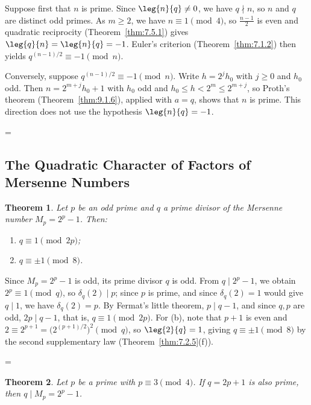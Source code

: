 \documentclass[11pt]{article}
\makeatletter
\theoremstyle{ntstyle}
\newtheorem{theorem}{Theorem}[subsection]
\let\nt@closedisplay\]
\def\nt@guardedclose{\@ifnextchar\par{\nt@closeafterpar}{\@ifnextchar\end{\postdisplaypenalty\@M\nt@closedisplay}{\nt@closedisplay}}}
\def\nt@closeafterpar\par{\@ifnextchar\par{\nt@closeafterpar}{\@ifnextchar\end{\postdisplaypenalty\@M\nt@closedisplay\par}{\nt@closedisplay\par}}}
\renewenvironment{proof}[1][\proofname]{\par
  \pushQED{\qed}\normalfont\topsep\medskipamount\edef\nt@afterproof{\@endparpenalty=\the\@endparpenalty\relax}\@beginparpenalty\@M\@endparpenalty\@M\let\]\nt@guardedclose\trivlist\item[]\textit{#1\@addpunct{.}} \ignorespaces}{\ifvmode\addpenalty\@M\fi\popQED\nt@afterproof\endtrivlist\@endpefalse}
\makeatother
\begin{document}
\begin{proof} Suppose first that $n$ is prime. Since $\leg{n}{q}\neq0$, we
	have $q\nmid n$, so $n$ and $q$ are distinct odd primes. As $m\ge2$, we
	have $n\equiv1\pmod{4}$, so $\tfrac{n-1}{2}$ is even and quadratic
	reciprocity (Theorem~\ref{thm:7.5.1}) gives
	$\leg{q}{n}=\leg{n}{q}=-1$. Euler's criterion
	(Theorem~\ref{thm:7.1.2}) then yields $q^{(n-1)/2}\equiv-1\pmod{n}$.

	Conversely, suppose $q^{(n-1)/2}\equiv-1\pmod{n}$. Write $h=2^{j}h_0$
	with $j\ge0$ and $h_0$ odd. Then $n=2^{m+j}h_0+1$ with $h_0$ odd and
	$h_0\le h<2^{m}\le2^{m+j}$, so Proth's theorem
	(Theorem~\ref{thm:9.1.6}), applied with $a=q$, shows that $n$ is prime.
	This direction does not use the hypothesis $\leg{n}{q}=-1$.

\end{proof}
\subsection{The Quadratic Character of Factors of Mersenne Numbers}

\begin{theorem}\label{thm:9.2.1} Let $p$ be an odd prime and $q$ a
	prime divisor of the Mersenne number $M_p = 2^p - 1$. Then:
	\begin{enumerate}[label={\alph*)}]
		\item $q\equiv 1 \pmod{2p}$;
		\item $q \equiv \pm 1 \pmod{8}$.
	\end{enumerate}

\end{theorem}

\begin{proof} Since $M_p = 2^{p} - 1$ is odd, its prime
	divisor $q$ is odd. From $q \mid 2^p - 1$, we obtain $2^p \equiv 1 \pmod{q}$, so $\delta_q(2) \mid p$; since $p$ is prime, and since
	$\delta_q(2) = 1$ would give $q \mid 1$, we have
	$\delta_q(2) = p$. By Fermat's little theorem, $p \mid q - 1$, and since
	$q, p$ are odd, $2p \mid q - 1$, that is, $q \equiv 1 \pmod{2p}$. For
	(b), note that $p+1$ is even and $2 \equiv 2^{p+1} = \big(2^{(p+1)/2}\big)^2
		\pmod{q}$, so $\leg{2}{q} = 1$, giving $q \equiv \pm 1
		\pmod{8}$ by the second supplementary law (Theorem~\ref{thm:7.2.5}(f)).

\end{proof}
\begin{theorem}\label{thm:9.2.2} Let $p$ be a prime with $p \equiv 3 \pmod{4}$. If $q = 2p
		+ 1$ is also prime, then $q \mid M_p = 2^{p} - 1$.

\end{theorem}
\end{document}
